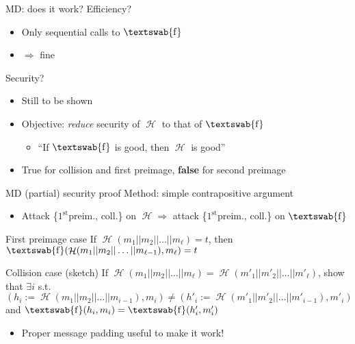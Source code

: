 \documentclass[xcolor=table,usenames,dvipsnames,compress]{beamer}
\newcommand\defas{:=}
\DeclareMathOperator\hash{\mathcal{H}}
\DeclareMathOperator\cf{\textswab{f}}
\begin{document}
\begin{frame}{MD: does it work?}
Efficiency?
\begin{itemize}
\item Only sequential calls to $\cf$
\item $\Rightarrow$ fine
\end{itemize}

Security?
\begin{itemize}
\item Still to be shown
\item Objective: \emph{reduce} security of $\hash$ to that of $\cf$
\begin{itemize}
\item ``If $\cf$ is good, then $\hash$ is good''
\end{itemize}
\item True for collision and first preimage, \textbf{false} for second preimage
\end{itemize}
\end{frame}

\begin{frame}{MD (partial) security proof}
Method: simple contrapositive argument
\begin{itemize}
\item Attack \{$1^\text{st}$preim., coll.\} on $\hash \Rightarrow$ attack \{$1^\text{st}$preim., coll.\} on $\cf$
\end{itemize}

\begin{alertblock}{First preimage case}
If $\hash(m_1||m_2||\ldots||m_\ell) = t$, then $\cf(\hash(m_1||m_2||\ldots||m_{\ell-1}), m_\ell) = t$
\end{alertblock}

\begin{alertblock}{Collision case (sketch)}
If $\hash(m_1||m_2||\ldots||m_\ell) = \hash(m'_1||m'_2||\ldots||m'_\ell)$, show that $\exists i$ s.t.
$(h_i \defas \hash(m_1||m_2||\ldots||m_{i-1}), m_i) \neq (h'_i \defas \hash(m'_1||m'_2||\ldots||m'_{i-1}), m'_i)$ and
$\cf(h_i, m_i) = \cf(h'_i, m'_i)$
\end{alertblock}
\begin{itemize}
\item Proper message padding useful to make it work!
\end{itemize}
\end{frame}
\end{document}
